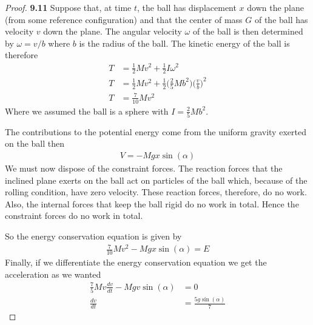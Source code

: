 \documentclass[11pt]{article}
\theoremstyle{definition}
\begin{document}
    \begin{proof}{\textbf{9.11}}
        Suppose that, at time $t$, the ball has displacement $x$ down the
        plane (from some reference conﬁguration) and that the center of mass 
        $G$ of the ball has velocity $v$ down the plane. The angular velocity
        $\omega$ of the ball is then determined by $\omega = v/b$ where $b$
        is the radius of the ball. The kinetic energy of the ball is
        therefore
        \begin{align*}
            T &= \frac{1}{2}Mv^2 + \frac{1}{2}I\omega^2\\
            T &= \frac{1}{2}Mv^2
            + \frac{1}{2}\bigg(\frac{2}{5}Mb^2\bigg)\bigg(\frac{v}{b}\bigg)^2\\
            T &= \frac{7}{10}Mv^2 
        \end{align*}
        Where we assumed the ball is a sphere with $I = \frac{2}{5}Mb^2$.

        The contributions to the potential energy come from the uniform
        gravity exerted on the ball then
        \begin{align*}
            V = -Mgx\sin(\alpha)
        \end{align*}
        We must now dispose of the constraint forces. The reaction forces that
        the inclined plane exerts on the ball act on particles of the ball
        which, because of the rolling condition, have zero velocity.
        These reaction forces, therefore, do no work. Also, the internal forces
        that keep the ball rigid do no work in total. Hence the constraint
        forces do no work in total.
        
        So the energy conservation equation is given by
        \begin{align*}
            \frac{7}{10}Mv^2 - Mgx\sin(\alpha) = E 
        \end{align*}
        Finally, if we differentiate the energy conservation equation we get
        the acceleration as we wanted
        \begin{align*}
            \frac{7}{5}Mv\frac{dv}{dt} - Mgv\sin(\alpha) &= 0\\
            \frac{dv}{dt} &= \frac{5g\sin(\alpha)}{7}
        \end{align*}
    \end{proof}
\cleardoublepage
\end{document}
